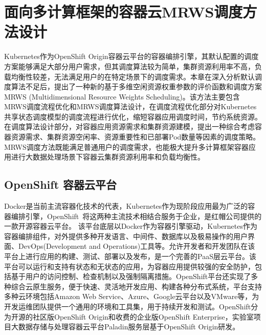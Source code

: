 \chapter{面向多计算框架的容器云MRWS调度方法设计}
Kubernetes作为OpenShift Origin容器云平台的容器编排引擎，其默认配置的调度方案能够满足大部分用户需求，但其调度算法较为简单，集群资源利用率不高，负载均衡性较差，无法满足用户的在特定场景下的调度需求。本章在深入分析默认调度算法不足后，提出了一种新的基于多维空闲资源权重参数的评价函数和调度方案MRWS (Multidimensional Resource Weights Scheduling)。该方法主要包含MRWS调度流程优化和MRWS调度算法设计，在调度流程优化部分对Kubernetes共享状态调度模型的调度流程进行优化，缩短容器应用调度时间，节约系统资源。在调度算法设计部分，对容器应用资源需求和集群资源建模，提出一种综合考虑容器资源需求、集群资源空闲率、资源重要性和已部署Pod数量等因素的调度策略。MRWS调度方法既能满足普通用户的调度需求，也能极大提升多计算框架容器应用进行大数据处理场景下容器云集群资源利用率和负载均衡性。

\section{OpenShift 容器云平台}
Docker是当前主流容器化技术的代表，Kubernetes作为现阶段应用最为广泛的容器编排引擎，OpenShift~\cite{Lossent2017PaaS}将这两种主流技术相结合服务于企业，是红帽公司提供的一款开源容器云平台。
该平台底层以Docker作为容器引擎驱动，Kubernetes作为容器编排组件，对外提供多种开发语言、中间件、数据库以及极易操作的用户界面、DevOps(Development and Operations)工具等。允许开发者和开发团队在该平台上进行应用的构建、测试、部署以及发布，是一个完善的PaaS层云平台。该平台可以运行和支持有状态和无状态的应用，为容器应用提供较强的安全防护，包括基于用户的访问控制、检查机制以及强制隔离措施。OpenShift平台还实现了多种综合云原生服务，便于快速、灵活地开发应用、构建各种分布式系统，平台支持多种云环境包括Amazon Web Service、Azure、Google云平台以及VMware等，为开发运维团队提供一个通用的环境和工具集，用于持续开发和测试。OpenShift分为开源的社区版OpenShift Origin和收费的企业版OpenShift Enterprise，实验室项目大数据存储与处理容器云平台Paladin服务层基于OpenShift Origin研发。

